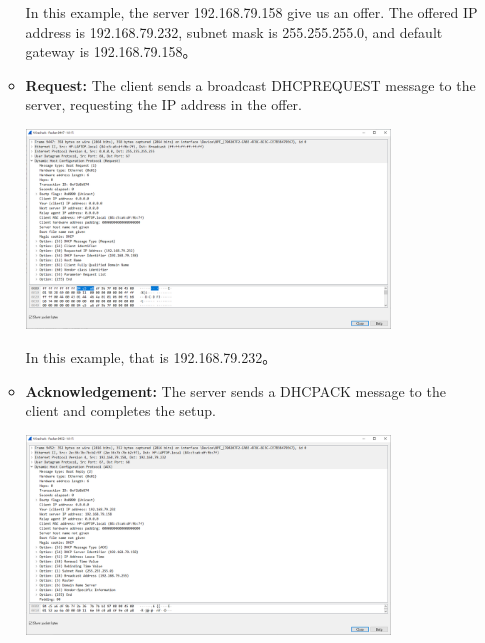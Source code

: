 \documentclass[12pt, a4paper]{article}
\begin{document}
\begin{enumerate}
\begin{itemize}
      In this example, the server 192.168.79.158 give us an offer. The offered
      IP address is 192.168.79.232, subnet mask is 255.255.255.0, and
      default gateway is 192.168.79.158。

      \pagebreak
      \item \textbf{Request:} The client sends a broadcast DHCPREQUEST message
      to the server, requesting the IP address in the offer.

      \includegraphics[width=0.8\textwidth]{wireshark_dhcp_request.png}

      In this example, that is 192.168.79.232。

      \item \textbf{Acknowledgement:} The server sends a DHCPACK message to
      the client and completes the setup.

      \includegraphics[width=0.8\textwidth]{wireshark_dhcp_ack.png}
    \end{itemize}


\end{enumerate}
\end{document}
